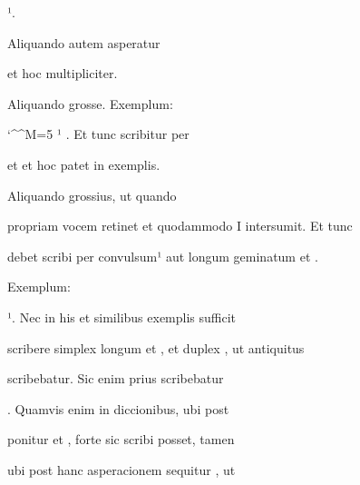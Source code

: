 \splitlines

  ¹.

\indentK Aliquando autem asperatur

\splitlines

et hoc multipliciter.

\indentK Aliquando grosse. Exemplum:  

\fulllines

\catcode `\^^M=5
\obeylines
{}  ¹ . Et tunc scribitur per  

\splitlines

 et  et hoc patet in exemplis.

Aliquando grossius, ut quando 

\fulllines

propriam vocem retinet et quodammodo I intersumit. Et tunc

debet scribi per  convulsum¹ aut longum geminatum et .


Exemplum:      

 ¹. Nec in his et similibus exemplis sufficit


scribere simplex  longum et , et duplex , ut antiquitus

scribebatur. Sic enim prius scribebatur  

. Quamvis enim in diccionibus, ubi post  


 ponitur     et , forte sic scribi posset, tamen

ubi post hanc asperacionem sequitur , ut  

